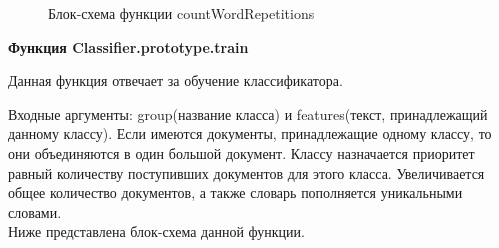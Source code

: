 \documentclass[14pt,a4paper]{extreport}
\begin{document}
    \begin{figure}[h]
    \caption{Блок-схема функции countWordRepetitions}
    \label{ris:image}
    \end{figure}
    \newpage \par \small \textbf{Функция Classifier.prototype.train}
    \\ \par Данная функция отвечает за обучение классификатора.
    \par Входные аргументы: group(название класса) и features(текст, принадлежащий данному классу). Если имеются документы, принадлежащие одному классу, то они объединяются в один большой документ. Классу назначается приоритет равный количеству поступивших документов для этого класса. Увеличивается общее количество документов, а также словарь пополняется уникальными словами.
    \\ Ниже представлена блок-схема данной функции.
\end{document}
